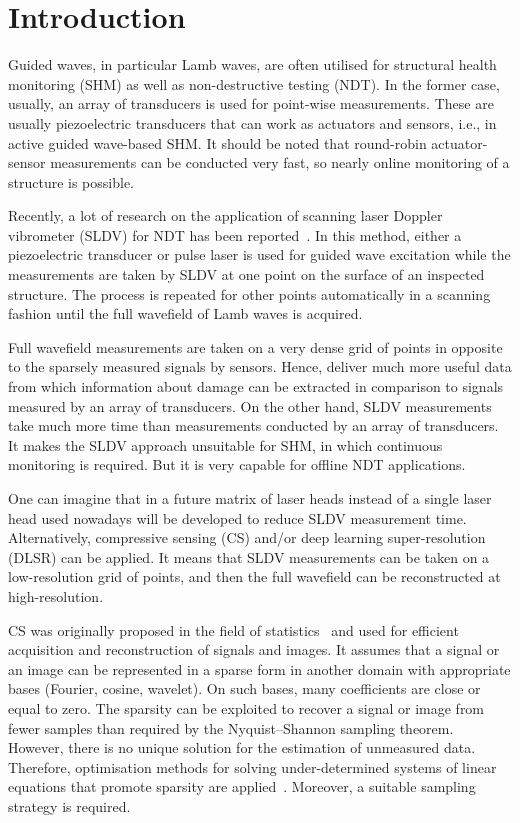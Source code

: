 \section{Introduction}
Guided waves, in particular Lamb waves, are often utilised for structural health monitoring (SHM) as well as non-destructive testing (NDT).
In the former case, usually, an array of transducers is used for point-wise measurements.
These are usually piezoelectric transducers that can work as actuators and sensors, i.e., in active guided wave-based SHM.
It should be noted that round-robin actuator-sensor measurements can be conducted very fast, so nearly online monitoring of a structure is possible.

Recently, a lot of research on the application of scanning laser Doppler vibrometer (SLDV) for NDT has been reported~\cite{Flynn2013,Kudela2015, Kudela2018d, Segers2021, Segers2022}. 
In this method, either a piezoelectric transducer or pulse laser is used for guided wave excitation while the measurements are taken by SLDV at one point on the surface of an inspected structure.
The process is repeated for other points automatically in a scanning fashion until the full wavefield of Lamb waves is acquired.

Full wavefield measurements are taken on a very dense grid of points in opposite to the sparsely measured signals by sensors.
Hence, deliver much more useful data from which information about damage can be extracted in comparison to signals measured by an array of transducers.
On the other hand, SLDV measurements take much more time than measurements conducted by an array of transducers.
It makes the SLDV approach unsuitable for SHM, in which continuous monitoring is required.
But it is very capable for offline NDT applications.

One can imagine that in a future matrix of laser heads instead of a single laser head used nowadays will be developed to reduce SLDV measurement time.
Alternatively, compressive sensing (CS) and/or deep learning super-resolution (DLSR) can be applied.
It means that SLDV measurements can be taken on a low-resolution grid of points, and then the full wavefield can be reconstructed at high-resolution.

CS was originally proposed in the field of statistics~\cite{Candes2006,Donoho2006} and used for efficient acquisition and reconstruction of signals and images.
It assumes that a signal or an image can be represented in a sparse form in another domain with appropriate bases (Fourier, cosine, wavelet).
On such bases, many coefficients are close or equal to zero.
The sparsity can be exploited to recover a signal or image from fewer samples than required by the Nyquist–Shannon sampling theorem.
However, there is no unique solution for the estimation of unmeasured data.
Therefore, optimisation methods for solving under-determined systems of linear equations that promote sparsity are applied~\cite{Chen1998,VanEwoutBerg2008,VandenBerg2019}.
Moreover, a suitable sampling strategy is required.

